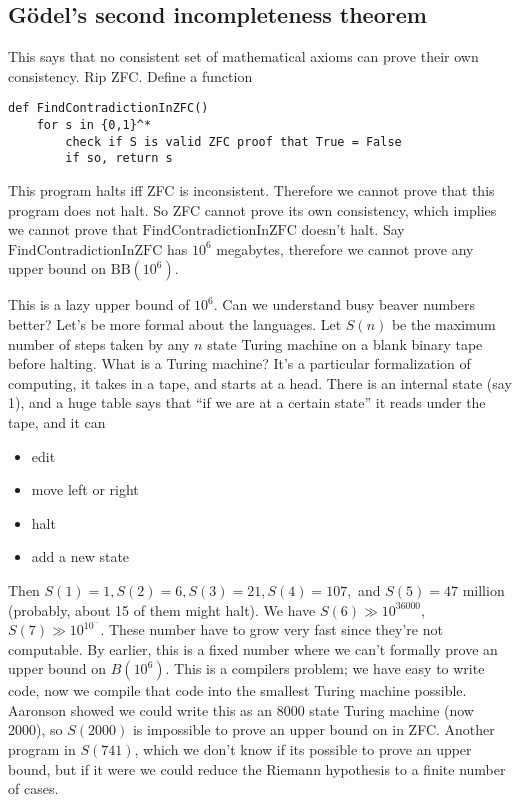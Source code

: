 \subsection*{G\"odel's second incompleteness theorem}
This says that no consistent set of mathematical axioms can prove their own consistency. Rip ZFC. Define a function 
\begin{verbatim}
def FindContradictionInZFC()
    for s in {0,1}^* 
        check if S is valid ZFC proof that True = False
        if so, return s
\end{verbatim}
This program halts iff ZFC is inconsistent. Therefore we cannot prove that this program does not halt. So ZFC cannot prove its own consistency, which implies we cannot prove that $\mathrm{FindContradictionInZFC}$ doesn't halt. Say $\mathrm{FindContradictionInZFC}$ has $10^6$ megabytes, therefore we cannot prove any upper bound on $\mathrm{BB}(10^6)$.

This is a lazy upper bound of $10^6$. Can we understand busy beaver numbers better? Let's be more formal about the languages. Let $S(n)$ be the maximum number of steps taken by any $n$ state Turing machine on a blank binary tape before halting. What is a Turing machine? It's a particular formalization of computing, it takes in a tape, and starts at a head. There is an internal state (say 1), and a huge table says that ``if we are at a certain state'' it reads under the tape, and it can
\begin{itemize}
\setlength\itemsep{-.2em}
    \item edit
    \item move left or right
    \item halt
    \item add a new state
\end{itemize}
Then $S(1)=1,S(2)=6,S(3)=21,S(4)=107,$ and $S(5)=47$ million (probably, about 15 of them might halt). We have $S(6)\gg 10^{36000}$, $S(7) \gg 10 ^{10 ^{ \cdots }}$. These number have to grow very fast since they're not computable. By earlier, this is a fixed number where we can't formally prove an upper bound on $B(10^6)$. This is a compilers problem; we have easy to write code, now we compile that code into the smallest Turing machine possible. Aaronson showed we could write this as an 8000 state Turing machine (now 2000), so $S(2000)$ is impossible to prove an upper bound on in ZFC. Another program in $S(741)$, which we don't know if its possible to prove an upper bound, but if it were we could reduce the Riemann hypothesis to a finite number of cases.

